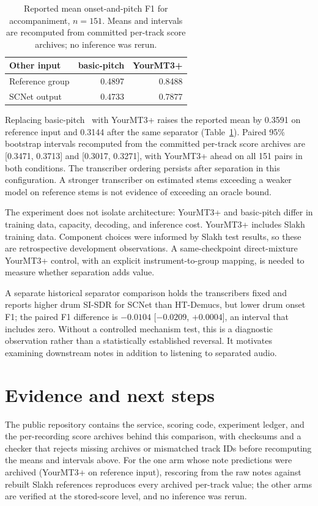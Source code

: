 \documentclass{article}
\begin{document}
\begin{table}[t]
\centering\small
\begin{tabular}{lrr}
\toprule
Other input & basic-pitch & YourMT3+ \\
\midrule
Reference group & 0.4897 & 0.8488 \\
SCNet output & 0.4733 & 0.7877 \\
\bottomrule
\end{tabular}
\caption{Reported mean onset-and-pitch F1 for accompaniment, $n=151$.
Means and intervals are recomputed from committed per-track score archives;
no inference was rerun.}
\label{tab:comparison}
\end{table}

Replacing basic-pitch~\cite{bittner2022basicpitch} with YourMT3+ raises the reported
mean by 0.3591 on reference input and 0.3144 after the same separator
(Table~\ref{tab:comparison}). Paired 95\% bootstrap intervals recomputed from the
committed per-track score archives are [0.3471, 0.3713] and [0.3017, 0.3271], with
YourMT3+ ahead on all 151 pairs in both conditions. The transcriber ordering
persists after separation in this configuration. A stronger
transcriber on estimated stems exceeding a weaker model on reference stems is
not evidence of exceeding an oracle bound.

The experiment does not isolate architecture: YourMT3+ and basic-pitch differ in
training data, capacity, decoding, and inference cost. YourMT3+ includes Slakh
training data. Component choices were informed by Slakh test results, so these
are retrospective development observations. A same-checkpoint direct-mixture
YourMT3+ control, with an explicit instrument-to-group mapping, is needed to
measure whether separation adds value.

A separate historical separator comparison holds the transcribers fixed and
reports higher drum SI-SDR for SCNet than HT-Demucs, but lower drum onset F1;
the paired F1 difference is $-0.0104$ [$-0.0209$, $+0.0004$], an interval that
includes zero. Without a controlled mechanism test, this is a diagnostic
observation rather than a statistically established reversal. It motivates
examining downstream notes in addition to listening to separated audio.

\section{Evidence and next steps}
The public repository contains the service, scoring code, experiment ledger, and
the per-recording score archives behind this comparison, with checksums and a
checker that rejects missing archives or mismatched track IDs before recomputing
the means and intervals above. For the one arm whose note predictions were
archived (YourMT3+ on reference input), rescoring from the raw notes against
rebuilt Slakh references reproduces every archived per-track value; the other
arms are verified at the stored-score level, and no inference was rerun.
\end{document}
